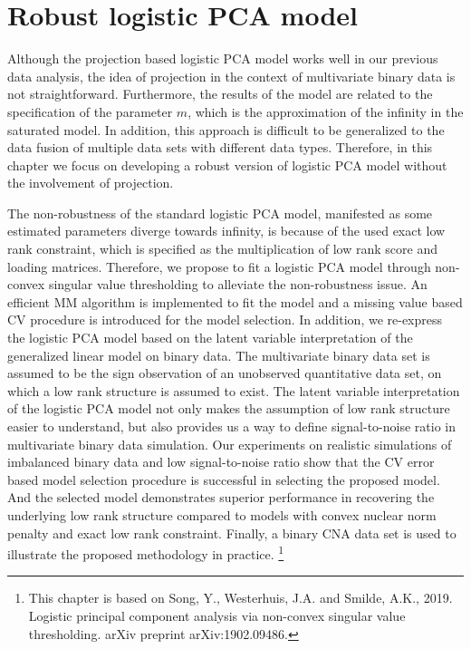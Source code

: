 \chapter{Robust logistic PCA model} \label{chapter:3}
Although the projection based logistic PCA model works well in our previous data analysis, the idea of projection in the context of multivariate binary data is not straightforward. Furthermore, the results of the model are related to the specification of the parameter $m$, which is the approximation of the infinity in the saturated model. In addition, this approach is difficult to be generalized to the data fusion of multiple data sets with different data types. Therefore, in this chapter we focus on developing a robust version of logistic PCA model without the involvement of projection.

The non-robustness of the standard logistic PCA model, manifested as some estimated parameters diverge towards infinity, is because of the used exact low rank constraint, which is specified as the multiplication of low rank score and loading matrices. Therefore, we propose to fit a logistic PCA model through non-convex singular value thresholding to alleviate the non-robustness issue. An efficient MM algorithm is implemented to fit the model and a missing value based CV procedure is introduced for the model selection. In addition, we re-express the logistic PCA model based on the latent variable interpretation of the generalized linear model on binary data. The multivariate binary data set is assumed to be the sign observation of an unobserved quantitative data set, on which a low rank structure is assumed to exist. The latent variable interpretation of the logistic PCA model not only makes the assumption of low rank structure easier to understand, but also provides us a way to define signal-to-noise ratio in multivariate binary data simulation. Our experiments on realistic simulations of imbalanced binary data and low signal-to-noise ratio show that the CV error based model selection procedure is successful in selecting the proposed model. And the selected model demonstrates superior performance in recovering the underlying low rank structure compared to models with convex nuclear norm penalty and exact low rank constraint. Finally, a binary CNA data set is used to illustrate the proposed methodology in practice.
\footnote{This chapter is based on Song, Y., Westerhuis, J.A. and Smilde, A.K., 2019. Logistic principal component analysis via non-convex singular value thresholding. arXiv preprint arXiv:1902.09486.}

